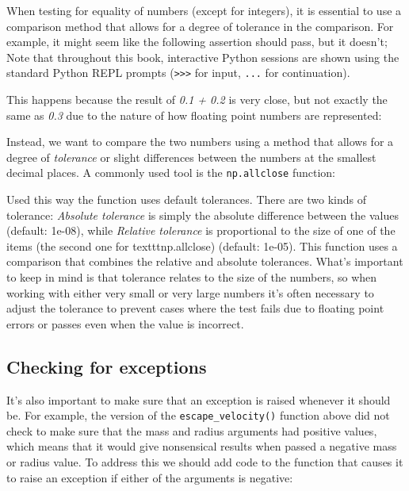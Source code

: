 

When testing for equality of numbers (except for integers), it is essential to use a comparison method that allows for a degree of tolerance in the comparison.  For example, it might seem like the following assertion should pass, but it doesn't; Note that throughout this book, interactive Python sessions are shown using the standard Python REPL prompts (\texttt{>>>} for input, \texttt{...} for continuation).



This happens because the result of \textit{0.1 + 0.2} is very close, but not exactly the same as \textit{0.3} due to the nature of how floating point numbers are represented:



Instead, we want to compare the two numbers using a method that allows for a degree of \textit{tolerance} or slight differences between the numbers at the smallest decimal places.  A commonly used tool is the \texttt{np.allclose} function:



Used this way the function uses default tolerances.  There are two kinds of tolerance: \textit{Absolute tolerance} is simply the absolute difference between the values (default: 1e-08), while \textit{Relative tolerance} is proportional to the size of one of the items (the second one for texttt{np.allclose}) (default: 1e-05).  This function uses a comparison that combines the relative and absolute tolerances.  What's important to keep in mind is that tolerance relates to the size of the numbers, so when working with either very small or very large numbers it's often necessary to adjust the tolerance to prevent cases where the test fails due to floating point errors or passes even when the value is incorrect.

\subsection{Checking for exceptions}

It's also important to make sure that an exception is raised whenever it should be.
For example, the version of the \texttt{escape\_velocity()} function above did not check to make sure that the mass and radius arguments had positive values, which means that it would give nonsensical results when passed a negative mass or radius value.
To address this we should add code to the function that causes it to raise an exception if either of the arguments is negative:

